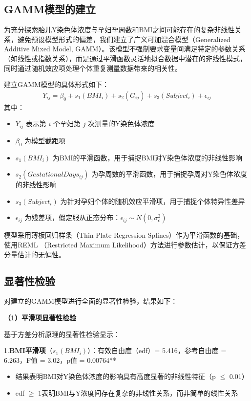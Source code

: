 \documentclass{article}
\begin{document}
\subsection{\textbf{GAMM模型的建立}}
为充分探索胎儿Y染色体浓度与孕妇孕周数和BMI之间可能存在的复杂非线性关系，避免预设模型形式的偏差，我们建立了广义可加混合模型（Generalized Additive Mixed Model, GAMM）。该模型不强制要求变量间满足特定的参数关系（如线性或指数关系），而是通过平滑函数灵活地拟合数据中潜在的非线性模式，同时通过随机效应项处理个体重复测量数据带来的相关性。

建立GAMM模型的具体形式如下：
\begin{gather}
    Y_{ij}=\beta_0+s_1(BMI_i)+s_2(G_{ij})+s_3(Subject_i)+\epsilon_{ij}\tag{3}
\end{gather}
其中：
\begin{itemize}
    \item $Y_{ij}$ 表示第 $i$ 个孕妇第 $j$ 次测量的Y染色体浓度
    \item $\beta_0$ 为模型截距项
    \item $s_1(BMI_i)$ 为BMI的平滑函数，用于捕捉BMI对Y染色体浓度的非线性影响
    \item $s_2(GestationalDays_{ij})$ 为孕周数的平滑函数，用于捕捉孕周对Y染色体浓度的非线性影响
    \item $s_3(Subject_i)$ 为针对孕妇个体的随机效应平滑项，用于捕捉个体特异性差异
    \item $\epsilon_{ij}$ 为残差项，假定服从正态分布：$\epsilon_{ij} \sim N(0, \sigma^2_\epsilon)$
\end{itemize}
模型采用薄板回归样条（Thin Plate Regression Splines）作为平滑函数的基础，使用REML
（Restricted Maximum Likelihood）方法进行参数估计，以保证方差分量估计的无偏性。
\subsection{\textbf{显著性检验}}
对建立的GAMM模型进行全面的显著性检验，结果如下：

\textbf{（1）平滑项显著性检验}

基于方差分析原理的显著性检验显示：

1.\textbf{BMI平滑项}（$s_1(BMI_i)$）：有效自由度（edf）= 5.416，参考自由度 = 6.263，F值 = 3.02，p值 = 0.00764**
\begin{itemize}
    \item 结果表明BMI对Y染色体浓度的影响具有高度显著的非线性特征（p $\leq$ 0.01）
    \item edf $\geq$ 1表明BMI与Y浓度间存在复杂的非线性关系，而非简单的线性关系
\end{itemize}
\end{document}
